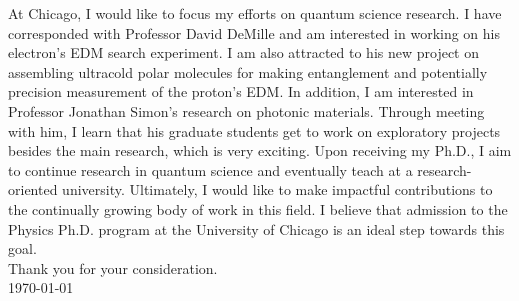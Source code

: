 \documentclass[12pt]{article}
\begin{document}
At Chicago, I would like to focus my efforts on quantum science research. I have corresponded with Professor David DeMille and am interested in working on his electron's EDM search experiment. I am also attracted to his new project on assembling ultracold polar molecules for making entanglement and potentially precision measurement of the proton's EDM. In addition, I am interested in Professor Jonathan Simon's research on photonic materials. Through meeting with him, I learn that his graduate students get to work on exploratory projects besides the main research, which is very exciting. Upon receiving my Ph.D., I aim to continue research in quantum science and eventually teach at a research-oriented university. Ultimately, I would like to make impactful contributions to the continually growing body of work in this field. I believe that admission to the Physics Ph.D. program at the University of Chicago is an ideal step towards this goal. \\

\noindent Thank you for your consideration. \\

\noindent \today






	
	
	
	
	
\end{document}
